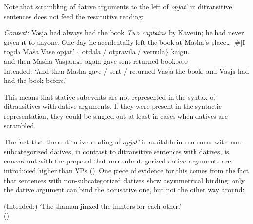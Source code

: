 \documentclass[output=paper]{langscibook}
\begin{document}
Note that scrambling of dative arguments to the left of \textit{opjat’} in ditransitive sentences does not feed the restitutive reading:


 \ea\label{ex:bondarenko:33}
\textit{Context:} Vasja had always had the book \textit{Two captains} by Kaverin; he had never given it to anyone. One day he accidentally left the book at Masha’s place\dots
\exi{}[\#]{\gll I togda Maša Vase opjat’ \{\hspace{-2pt} otdala / otpravila / vernula\} knigu.\\
     and then Masha Vasja.\textsc{dat} again {} gave {} sent {} returned book.\textsc{acc}\\
\glt Intended: `And then Masha gave / sent / returned Vasja the book, and Vasja had had the book before.'}
\z

\noindent This means that stative subevents are not represented in the syntax of ditransitives with dative arguments. If they were present in the syntactic representation, they could be singled out at least in cases when datives are scrambled.


\largerpage[2]
The fact that the restitutive reading of \textit{opjat’} is available in sentences with non-subcategorized datives, in contrast to ditransitive sentences with datives, is concordant with the proposal that non-subcategorized dative arguments are introduced higher than VPs (\citealt{Boneh-Nash2017}). One piece of evidence for this comes from the fact that sentences with non-subcategorized datives show asymmetrical binding: only the dative argument can bind the accusative one, but not the other way around:\largerpage


 \ea\label{ex:bondarenko:34}
\z
\glt (Intended:) `The shaman jinxed the hunters for each other.'\\\hfill (\citealt{Boneh-Nash2017})
\z
\end{document}
